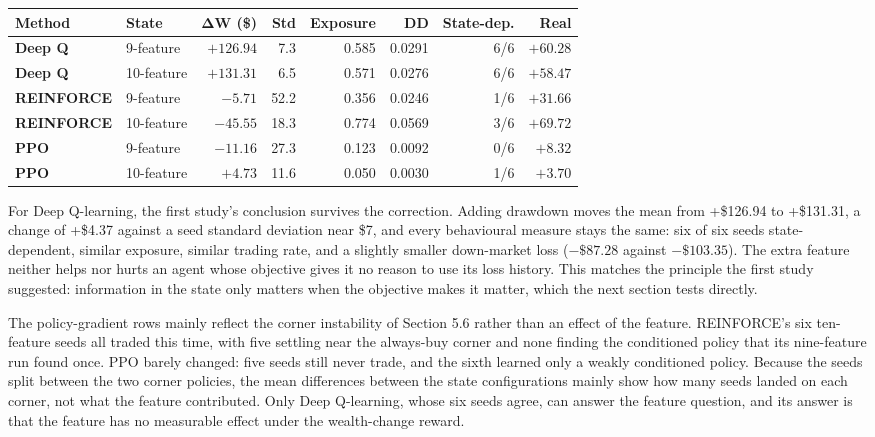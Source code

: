 {\def\LTcaptype{none}
\begin{longtable}[]{@{}llrrrrrr@{}}
\toprule\noalign{}
\textbf{Method} & \textbf{State} & \textbf{ΔW (\$)} & \textbf{Std} &
\textbf{Exposure} & \textbf{DD} & \textbf{State-dep.} & \textbf{Real} \\
\midrule\noalign{}
\endhead
\bottomrule\noalign{}
\endlastfoot
\textbf{Deep Q} & 9-feature & \(+126.94\) & 7.3 & 0.585 & 0.0291 & 6/6 & \(+60.28\) \\
\rowsep
\textbf{Deep Q} & 10-feature & \(+131.31\) & 6.5 & 0.571 & 0.0276 & 6/6 & \(+58.47\) \\
\rowsep
\textbf{REINFORCE} & 9-feature & \(-5.71\) & 52.2 & 0.356 & 0.0246 & 1/6 & \(+31.66\) \\
\rowsep
\textbf{REINFORCE} & 10-feature & \(-45.55\) & 18.3 & 0.774 & 0.0569 & 3/6 & \(+69.72\) \\
\rowsep
\textbf{PPO} & 9-feature & \(-11.16\) & 27.3 & 0.123 & 0.0092 & 0/6 & \(+8.32\) \\
\rowsep
\textbf{PPO} & 10-feature & \(+4.73\) & 11.6 & 0.050 & 0.0030 & 1/6 & \(+3.70\) \\
\end{longtable}
}

For Deep Q-learning, the first study's conclusion survives the correction.
Adding drawdown moves the mean from +\$126.94 to +\$131.31, a change of
+\$4.37 against a seed standard deviation near \$7, and every behavioural
measure stays the same: six of six seeds state-dependent, similar exposure,
similar trading rate, and a slightly smaller down-market loss (\(-\$87.28\)
against \(-\$103.35\)). The extra feature neither helps nor hurts an
agent whose objective gives it no reason to use its loss history. This
matches the principle the first study suggested: information in the state
only matters when the objective makes it matter, which the next section
tests directly.

The policy-gradient rows mainly reflect the corner instability of
Section 5.6 rather than an effect of the feature. REINFORCE's six
ten-feature seeds all traded this time, with five settling near the
always-buy corner and none finding the conditioned policy that its
nine-feature run found once. PPO barely changed: five seeds still never
trade, and the sixth learned only a weakly conditioned policy. Because
the seeds split between the two corner policies, the mean differences
between the state configurations mainly show how many seeds landed on
each corner, not what the feature contributed. Only Deep Q-learning,
whose six seeds agree, can answer the feature question, and its answer
is that the feature has no measurable effect under the wealth-change
reward.

